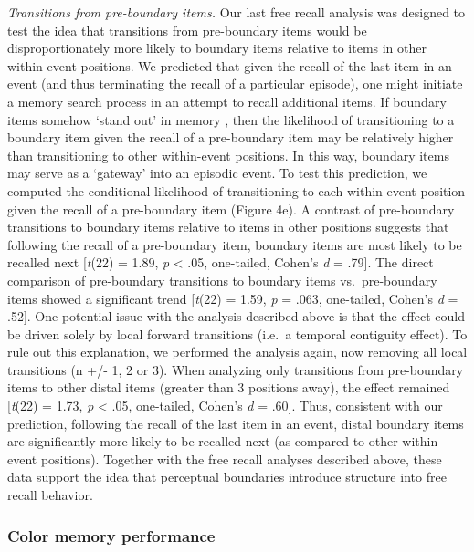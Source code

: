 \emph{Transitions from pre-boundary items.} Our last free recall
analysis was designed to test the idea that transitions from
pre-boundary items would be disproportionately more likely to boundary
items relative to items in other within-event positions. We predicted
that given the recall of the last item in an event (and thus terminating
the recall of a particular episode), one might initiate a memory search
process in an attempt to recall additional items. If boundary items
somehow `stand out' in memory
\autocites{radvansky_across_2012}{zacks_event_2007}, then the likelihood
of transitioning to a boundary item given the recall of a pre-boundary
item may be relatively higher than transitioning to other within-event
positions. In this way, boundary items may serve as a `gateway' into an
episodic event. To test this prediction, we computed the conditional
likelihood of transitioning to each within-event position given the
recall of a pre-boundary item (Figure 4e). A contrast of pre-boundary
transitions to boundary items relative to items in other positions
suggests that following the recall of a pre-boundary item, boundary
items are most likely to be recalled next {[}\emph{t}(22) = 1.89,
\emph{p} \textless{} .05, one-tailed, Cohen's \emph{d} = .79{]}. The
direct comparison of pre-boundary transitions to boundary items
vs.~pre-boundary items showed a significant trend {[}\emph{t}(22) =
1.59, \emph{p} = .063, one-tailed, Cohen's \emph{d} = .52{]}. One
potential issue with the analysis described above is that the effect
could be driven solely by local forward transitions (i.e.~a temporal
contiguity effect). To rule out this explanation, we performed the
analysis again, now removing all local transitions (n +/- 1, 2 or 3).
When analyzing only transitions from pre-boundary items to other distal
items (greater than 3 positions away), the effect remained
{[}\emph{t}(22) = 1.73, \emph{p} \textless{} .05, one-tailed, Cohen's
\emph{d} = .60{]}. Thus, consistent with our prediction, following the
recall of the last item in an event, distal boundary items are
significantly more likely to be recalled next (as compared to other
within event positions). Together with the free recall analyses
described above, these data support the idea that perceptual boundaries
introduce structure into free recall behavior.

\subsubsection{Color memory performance}\label{color-memory-performance}

